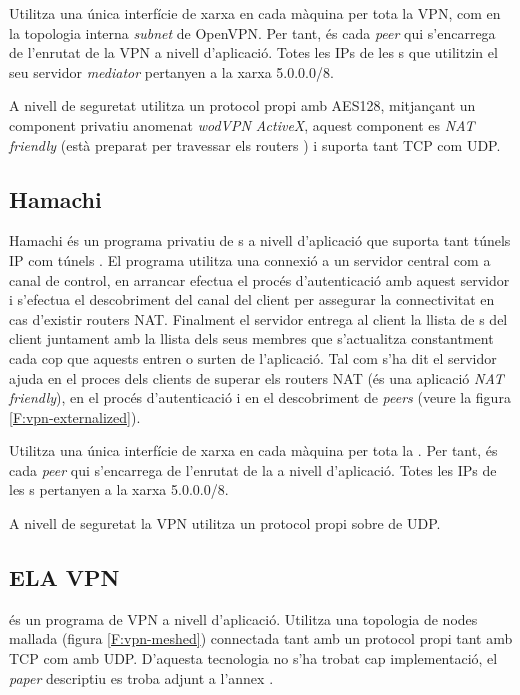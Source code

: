 Utilitza una única interfície de xarxa en cada màquina per tota la VPN, com en la topologia interna \emph{subnet} de OpenVPN. Per tant, és cada \emph{peer} qui s'encarrega de l'enrutat de la VPN a nivell d'aplicació. Totes les IPs de les s que utilitzin el seu servidor \emph{mediator} pertanyen a la xarxa 5.0.0.0/8.

A nivell de seguretat utilitza un protocol propi amb AES128, mitjançant un component privatiu anomenat \emph{wodVPN ActiveX}, aquest component es \emph{NAT friendly} (està preparat per travessar els routers ) i suporta tant TCP com UDP.

\subsection{Hamachi}
Hamachi és un programa privatiu de s a nivell d'aplicació que suporta tant túnels IP com túnels .
El programa utilitza una connexió a un servidor central com a canal de control, en arrancar efectua el procés d'autenticació amb aquest servidor i s'efectua el descobriment del canal del client per assegurar la connectivitat en cas d'existir routers NAT. Finalment el servidor entrega al client la llista de s del client juntament amb la llista dels seus membres que s'actualitza constantment cada cop que aquests entren o surten de l'aplicació. Tal com s'ha dit el servidor ajuda en el proces dels clients de superar els routers NAT (és una aplicació \emph{NAT friendly}), en el procés d'autenticació i en el descobriment de \emph{peers} (veure la figura \ref{F:vpn-externalized}).

Utilitza una única interfície de xarxa en cada màquina per tota la . Per tant, és cada \emph{peer} qui s'encarrega de l'enrutat de la  a nivell d'aplicació. Totes les IPs de les s pertanyen a la xarxa 5.0.0.0/8.

A nivell de seguretat la VPN utilitza un protocol propi sobre de UDP.

\subsection{ELA VPN}
 és un programa de VPN a nivell d'aplicació.
Utilitza una topologia de nodes mallada (figura \ref{F:vpn-meshed}) connectada tant amb un protocol propi tant amb TCP com amb UDP.
D'aquesta tecnologia no s'ha trobat cap implementació, el \emph{paper} descriptiu es troba adjunt a l'annex .

